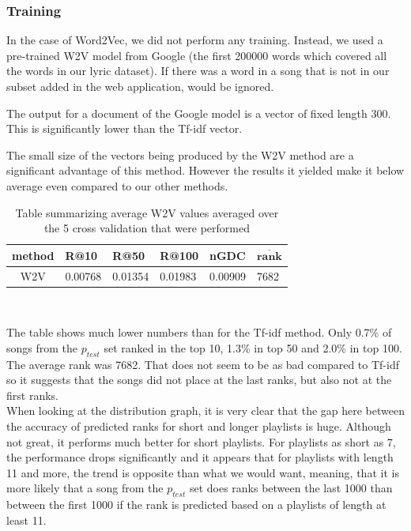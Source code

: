 \subsubsection{Training}
In the case of Word2Vec, we did not perform any training. Instead, we used a pre-trained W2V model from Google (the first 200000 words which covered all the words in our lyric dataset). If there was a word in a song that is not in our subset added in the web application, would be ignored.

The output for a document of the Google model is a vector of fixed length 300. This is significantly lower than the Tf-idf vector.

The small size of the vectors being produced by the W2V method are a significant advantage of this method. However the results it yielded make it below average even compared to our other methods.

\begin{table}[h!]
\centering
\renewcommand{\arraystretch}{1.5}
\begin{tabu} to 1\textwidth { | c || X[c] | X[c] | X[c] | X[c] | X[c] |}
 \hline
 \textbf{method} & \textbf{R@10} & \textbf{R@50} & \textbf{R@100} & \textbf{nGDC} & $ \boldsymbol{\overline{rank}} $ \\
 \hline
 \hline
 W2V & 0.00768 & 0.01354 & 0.01983 & 0.00909 & 7682 \\
 \hline
\end{tabu} \\
\caption{Table summarizing average W2V values averaged over the 5 cross validation that were performed}
\label{table:2}
\end{table}

The table shows much lower numbers than for the Tf-idf method. Only 0.7\% of songs from the $ p_{test} $ set ranked in the top 10, 1.3\% in top 50 and 2.0\% in top 100. The average rank was 7682. That does not seem to be as bad compared to Tf-idf so it suggests that the songs did not place at the last ranks, but also not at the first ranks. \\
When looking at the distribution graph, it is very clear that the gap here between the accuracy of predicted ranks for short and longer playlists is huge. Although not great, it performs much better for short playlists. For playlists as short as 7, the performance drops significantly and it appears that for playlists with length 11 and more, the trend is opposite than what we would want, meaning, that it is more likely that a song from the $p_{test}$ set does ranks between the last 1000 than between the first 1000 if the rank is predicted based on a playlists of length at least 11.

